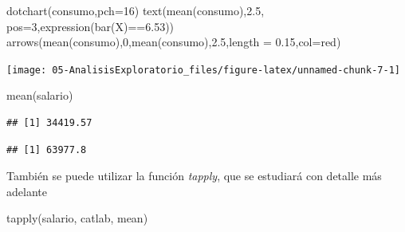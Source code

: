 \documentclass[
]{book}
\newenvironment{Shaded}{\begin{snugshade}}{\end{snugshade}}
\newcommand{\AttributeTok}[1]{\textcolor[rgb]{0.77,0.63,0.00}{#1}}
\newcommand{\DecValTok}[1]{\textcolor[rgb]{0.00,0.00,0.81}{#1}}
\newcommand{\FloatTok}[1]{\textcolor[rgb]{0.00,0.00,0.81}{#1}}
\newcommand{\FunctionTok}[1]{\textcolor[rgb]{0.00,0.00,0.00}{#1}}
\newcommand{\NormalTok}[1]{#1}
\newcommand{\SpecialCharTok}[1]{\textcolor[rgb]{0.00,0.00,0.00}{#1}}
\newcommand{\StringTok}[1]{\textcolor[rgb]{0.31,0.60,0.02}{#1}}
\theoremstyle{break}
\theoremstyle{nonumberplain}
\begin{document}
\begin{Shaded}
\begin{Highlighting}[]
\FunctionTok{dotchart}\NormalTok{(consumo,}\AttributeTok{pch=}\DecValTok{16}\NormalTok{)}
\FunctionTok{text}\NormalTok{(}\FunctionTok{mean}\NormalTok{(consumo),}\FloatTok{2.5}\NormalTok{, }\AttributeTok{pos=}\DecValTok{3}\NormalTok{,}\FunctionTok{expression}\NormalTok{(}\FunctionTok{bar}\NormalTok{(X)}\SpecialCharTok{==}\FloatTok{6.53}\NormalTok{))}
\FunctionTok{arrows}\NormalTok{(}\FunctionTok{mean}\NormalTok{(consumo),}\DecValTok{0}\NormalTok{,}\FunctionTok{mean}\NormalTok{(consumo),}\FloatTok{2.5}\NormalTok{,}\AttributeTok{length =} \FloatTok{0.15}\NormalTok{,}\AttributeTok{col=}\StringTok{\textquotesingle{}red\textquotesingle{}}\NormalTok{)}
\end{Highlighting}
\end{Shaded}

\begin{center}\texttt{[image: 05-AnalisisExploratorio\_files/figure-latex/unnamed-chunk-7-1]} \end{center}

\begin{Shaded}
\begin{Highlighting}[]
\FunctionTok{mean}\NormalTok{(salario)}
\end{Highlighting}
\end{Shaded}

\begin{verbatim}
## [1] 34419.57
\end{verbatim}

\begin{Shaded}
\end{Shaded}

\begin{verbatim}
## [1] 63977.8
\end{verbatim}

También se puede utilizar la función \emph{tapply}, que se estudiará
con detalle más adelante

\begin{Shaded}
\begin{Highlighting}[]
\FunctionTok{tapply}\NormalTok{(salario, catlab, mean)}
\end{Highlighting}
\end{Shaded}
\end{document}
